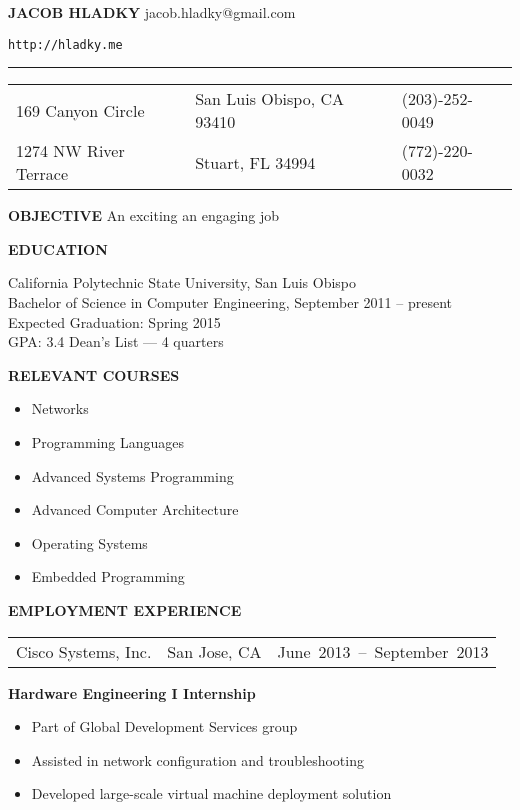 \documentclass[12pt]{article}
\begin{document}
\textbf{\huge{JACOB HLADKY}}
jacob.hladky@gmail.com

\texttt{http://hladky.me}

\rule{\textwidth}{0.5pt}


\begin{tabularx}{\textwidth}{@{}XCR@{}}
  169 Canyon Circle & San Luis Obispo, CA 93410 & (203)-252-0049 \\
  1274 NW River Terrace & Stuart, FL 34994 & (772)-220-0032
\end{tabularx}

\textbf{OBJECTIVE}\hspace{.1\textwidth} An exciting an engaging job

\textbf{EDUCATION}
\begin{adjustwidth*}{3em}{0em}
California Polytechnic State University, San Luis Obispo\\
Bachelor of Science in Computer Engineering, September 2011 – present\\
Expected Graduation: Spring 2015\\
GPA: 3.4 \hspace{.1\textwidth} Dean's List --- 4 quarters


\textbf{RELEVANT COURSES}
\begin{multicols}{2}
  \begin{itemize}[label={}]
  \item Networks
  \item Programming Languages
  \item Advanced Systems Programming
  \item Advanced Computer Architecture
  \item Operating Systems
  \item Embedded Programming
  \end{itemize}
\end{multicols}

\end{adjustwidth*}

\textbf{EMPLOYMENT EXPERIENCE}
\begin{adjustwidth*}{3em}{0em}
  \vspace*{-3mm}
  \begin{tabularx}{\linewidth}{@{}XCR@{}}
    Cisco Systems, Inc. & San Jose, CA & \mbox{June 2013 -- September 2013}
  \end{tabularx}
  \textbf{Hardware Engineering I Internship}
  \begin{itemize}
  \item Part of Global Development Services group
  \item Assisted in network configuration and troubleshooting
  \item Developed large-scale virtual machine deployment solution
  \end{itemize}
\end{adjustwidth*}
\end{document}
